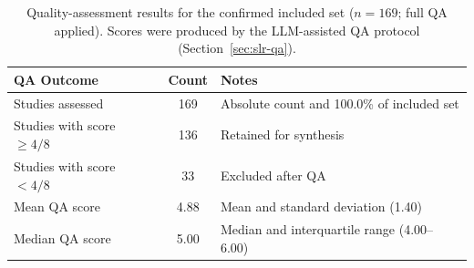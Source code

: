 \begin{table}[htbp]
\centering
\caption{Quality-assessment results for the confirmed included set ($n = 169$; full QA applied). Scores were produced by the LLM-assisted QA protocol (Section~\ref{sec:slr-qa}).}
\label{tab:qa-results}
\begin{tabular}{lcp{6.5cm}}
\toprule
\textbf{QA Outcome} & \textbf{Count} & \textbf{Notes} \\
\midrule
Studies assessed & 169 & Absolute count and 100.0\% of included set \\
Studies with score $\geq 4/8$ & 136 & Retained for synthesis \\
Studies with score $< 4/8$ & 33 & Excluded after QA \\
Mean QA score & 4.88 & Mean and standard deviation (1.40) \\
Median QA score & 5.00 & Median and interquartile range (4.00--6.00) \\
\bottomrule
\end{tabular}
\end{table}
